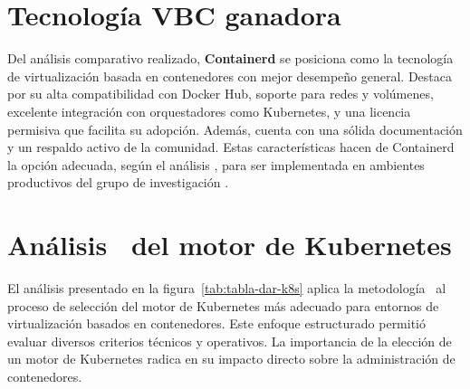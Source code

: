 \section{Tecnología VBC ganadora}
\noindent
Del análisis comparativo realizado, \textbf{Containerd} se posiciona como la tecnología de virtualización basada en contenedores con mejor desempeño general. Destaca por su alta compatibilidad con Docker Hub, soporte para redes y volúmenes, excelente integración con orquestadores como Kubernetes, y una licencia permisiva que facilita su adopción. Además, cuenta con una sólida documentación y un respaldo activo de la comunidad. Estas características hacen de Containerd la opción adecuada, según el análisis \DAR, para ser implementada en ambientes productivos del grupo de investigación \GRID.
\clearpage
\section{Análisis \DAR\ del motor de Kubernetes}
\noindent
El análisis presentado en la figura~\ref{tab:tabla-dar-k8s} aplica la metodología \DAR\ al proceso de selección del motor de Kubernetes más adecuado para entornos de virtualización basados en contenedores. Este enfoque estructurado permitió evaluar diversos criterios técnicos y operativos. La importancia de la elección de un motor de Kubernetes radica en su impacto directo sobre la administración de contenedores. 

